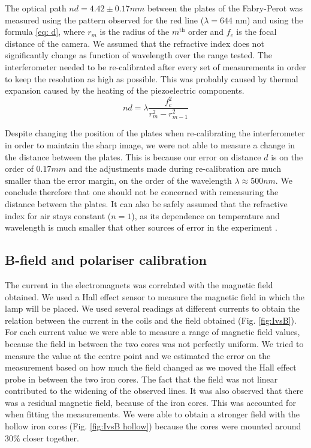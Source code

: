 \documentclass[11pt]{article}
\begin{document}
The optical path $nd = 4.42 \pm 0.17 \si{mm}$ between the plates of the Fabry-Perot was measured using the pattern observed for the red line ($\lambda = 644$ nm) and using the formula \eqref{eq: d}, where $r_m$ is the radius of the $m^{\text{th}}$ order and $f_c$ is the focal distance of the camera. We assumed that the refractive index does not significantly change as function of wavelength over the range tested. The interferometer needed to be re-calibrated after every set of measurements in order to keep the resolution as high as possible. This was probably caused by thermal expansion caused by the heating of the piezoelectric components. 
\begin{equation}
    nd = \lambda \frac{f_c^2}{r_m^2-r_{m-1}^2} \label{eq: d}
\end{equation}


Despite changing the position of the plates when re-calibrating the interferometer in order to maintain the sharp image, we were not able to measure a change in the distance between the plates. This is because our error on distance $d$ is on the order of $0.17 \si{mm}$ and the adjustments made during re-calibration are much smaller than the error margin, on the order of the wavelength $\lambda \approx 500 \si{nm}$. We conclude therefore that one should not be concerned with remeasuring the distance between the plates. It can also be safely assumed that the refractive index for air stays constant ($n=1$), as its dependence on temperature and wavelength is much smaller that other sources of error in the experiment \cite{Polyanskiy2024}. 

\subsection{B-field and polariser calibration}
The current in the electromagnets was correlated with the magnetic field obtained. We used a Hall effect sensor to measure the magnetic field in which the lamp will be placed. We used several readings at different currents to obtain the relation between the current in the coils and the field obtained (Fig. \ref{fig:IvsB}). For each current value we were able to measure a range of magnetic field values, because the field in between the two cores was not perfectly uniform. We tried to measure the value at the centre point and we estimated the error on the measurement based on how much the field changed as we moved the Hall effect probe in between the two iron cores. The fact that the field was not linear contributed to the widening of the observed lines. It was also observed that there was a residual magnetic field, because of the iron cores. This was accounted for when fitting the measurements. We were able to obtain a stronger field with the hollow iron cores (Fig. \ref{fig:IvsB hollow}) because the cores were mounted around $30\%$ closer together.
\end{document}
